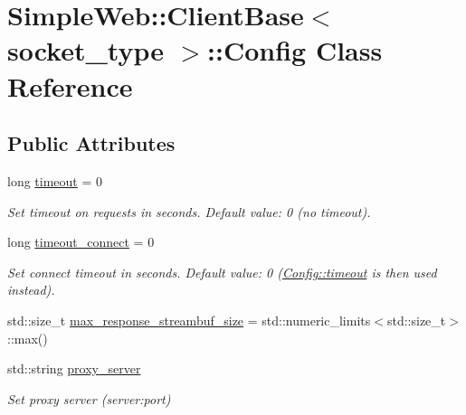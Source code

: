 \hypertarget{classSimpleWeb_1_1ClientBase_1_1Config}{}\section{Simple\+Web\+:\+:Client\+Base$<$ socket\+\_\+type $>$\+:\+:Config Class Reference}
\label{classSimpleWeb_1_1ClientBase_1_1Config}
\subsection*{Public Attributes}
\begin{DoxyCompactItemize}
\item 
long \hyperlink{classSimpleWeb_1_1ClientBase_1_1Config_a5159d60e8bbffaf581bc259cde5c5a5a}{timeout} = 0\hypertarget{classSimpleWeb_1_1ClientBase_1_1Config_a5159d60e8bbffaf581bc259cde5c5a5a}{}\label{classSimpleWeb_1_1ClientBase_1_1Config_a5159d60e8bbffaf581bc259cde5c5a5a}

\begin{DoxyCompactList}\small\item\em Set timeout on requests in seconds. Default value\+: 0 (no timeout). \end{DoxyCompactList}\item 
long \hyperlink{classSimpleWeb_1_1ClientBase_1_1Config_a5528ac783a5b53328ae54a315f2cf0b5}{timeout\+\_\+connect} = 0\hypertarget{classSimpleWeb_1_1ClientBase_1_1Config_a5528ac783a5b53328ae54a315f2cf0b5}{}\label{classSimpleWeb_1_1ClientBase_1_1Config_a5528ac783a5b53328ae54a315f2cf0b5}

\begin{DoxyCompactList}\small\item\em Set connect timeout in seconds. Default value\+: 0 (\hyperlink{classSimpleWeb_1_1ClientBase_1_1Config_a5159d60e8bbffaf581bc259cde5c5a5a}{Config\+::timeout} is then used instead). \end{DoxyCompactList}\item 
std\+::size\+\_\+t \hyperlink{classSimpleWeb_1_1ClientBase_1_1Config_a9858f6441a88cb6307584da4509681cb}{max\+\_\+response\+\_\+streambuf\+\_\+size} = std\+::numeric\+\_\+limits$<$std\+::size\+\_\+t$>$\+::max()
\item 
std\+::string \hyperlink{classSimpleWeb_1_1ClientBase_1_1Config_a6eb0382dccf50e9e8bdc541d3f06f9d5}{proxy\+\_\+server}\hypertarget{classSimpleWeb_1_1ClientBase_1_1Config_a6eb0382dccf50e9e8bdc541d3f06f9d5}{}\label{classSimpleWeb_1_1ClientBase_1_1Config_a6eb0382dccf50e9e8bdc541d3f06f9d5}

\begin{DoxyCompactList}\small\item\em Set proxy server (server\+:port) \end{DoxyCompactList}\end{DoxyCompactItemize}
